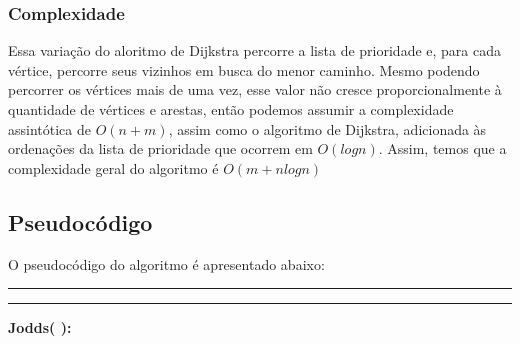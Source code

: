 \documentclass[12pt]{article}
\begin{document}
		\subsubsection*{Complexidade}
		\par Essa variação do aloritmo de Dijkstra percorre a lista de prioridade e, para cada vértice, percorre seus vizinhos em busca do menor caminho. Mesmo podendo percorrer os vértices mais de uma vez, esse valor não cresce proporcionalmente à quantidade de vértices e arestas, então podemos assumir a complexidade assintótica de $O(n+m)$, assim como o algoritmo de Dijkstra, adicionada às ordenações da lista de prioridade que ocorrem em $O(logn)$. Assim, temos que a complexidade geral do algoritmo é $O(m+nlogn)$
	
	\subsection*{Pseudocódigo}
		
		\par O pseudocódigo do algoritmo é apresentado abaixo:
		
		\newpage
		\hrule
		\vspace{3pt}
		\hrule
		\noindent\textbf{Jodds( ):}
		
\end{document}
